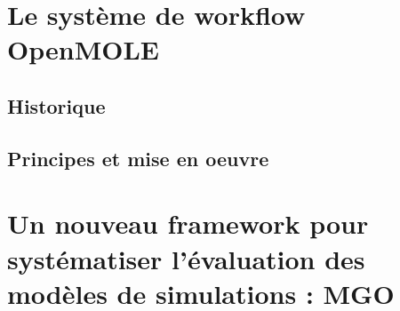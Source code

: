 
\newcommand\litem[1]{\item{\bfseries #1,\enspace}}

\section{Le système de workflow OpenMOLE}
\label{sec:openMOLE}

\subsection{Historique}

\subsection{Principes et mise en oeuvre}

\section{Un nouveau framework pour systématiser l'évaluation des modèles de simulations : MGO}
\label{sec:MGO}


